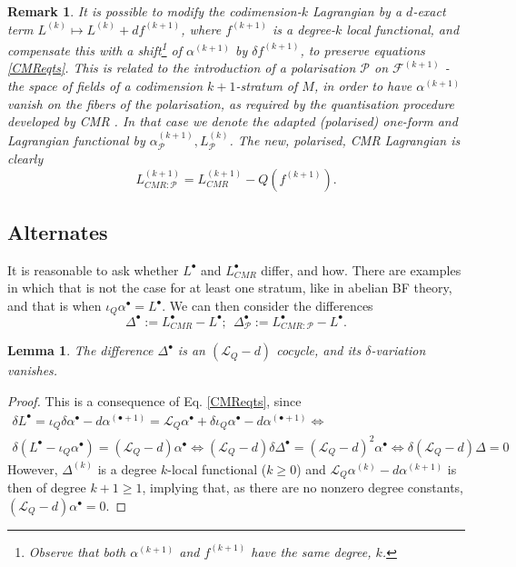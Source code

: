 \documentclass[a4paper,reqno]{amsart}
\newtheorem{lemma}[definition]{Lemma}
\newtheorem{remark}[definition]{Remark}
\newcommand{\LQ}{\mathcal{L}_{Q}}
\begin{document}
\begin{remark}\label{polarisationremark}
It is possible to modify the codimension-$k$ Lagrangian by a $d$-exact term $L^{(k)} \mapsto L^{(k)} + df^{(k+1)}$, where $f^{(k+1)}$ is a degree-$k$ local functional, and compensate this with a shift\footnote{Observe that both $\alpha^{(k+1)}$ and $f^{(k+1)}$ have the same degree, $k$.} of $\alpha^{(k+1)}$ by $\delta f^{(k+1)}$, to preserve equations \eqref{CMReqts}. This is related to the introduction of a polarisation $\mathcal{P}$ on $\mathcal{F}^{(k+1)}$ - the space of fields of a codimension $k+1$-stratum of $M$, in order to have $\alpha^{(k+1)}$ vanish on the fibers of the polarisation, as required by the quantisation procedure developed by CMR \cite{CMR2}. In that case we denote the adapted (polarised) one-form and Lagrangian functional by $\alpha^{(k+1)}_{\mathcal{P}},L^{(k)}_{\mathcal{P}}$. The new, polarised, CMR Lagrangian is clearly 
$$L^{(k+1)}_{CMR:\mathcal{P}}=L^{(k+1)}_{CMR} - Q (f^{(k+1)}).$$
\end{remark}

\subsection{Alternates}

It is reasonable to ask whether $L^{\bullet}$ and $L^{\bullet}_{CMR}$ differ, and how. There are examples in which that is not the case for at least one stratum, like in abelian BF theory, and that is when $\iota_{Q}\alpha^{\bullet} = L^{\bullet}$. We can then consider the differences
\begin{equation}
\Delta^{\bullet} := L^{\bullet}_{CMR} - L^{\bullet};\ \ \Delta^{\bullet}_{\mathcal{P}} := L^{\bullet}_{CMR:\mathcal{P}} - L^{\bullet}.
\end{equation}


\begin{lemma}\label{Deltacocycle}
The difference $\Delta^\bullet$ is an $(\LQ - d)$ cocycle, and its $\delta$-variation vanishes.
\end{lemma}

\begin{proof}
This is a consequence of Eq. \eqref{CMReqts}, since
\begin{multline}
\delta L^\bullet = \iota_Q\delta\alpha^{\bullet} - d\alpha^{(\bullet+1)} = \LQ\alpha^\bullet + \delta\iota_Q\alpha^\bullet - d\alpha^{(\bullet+1)} \iff \\
\delta (L^\bullet-\iota_Q\alpha^\bullet) = (\LQ - d)\alpha^\bullet \iff (\LQ - d)\delta \Delta^\bullet = (\LQ - d)^2\alpha^\bullet\iff \delta (\LQ - d)\Delta = 0
\end{multline}
However, $\Delta^{(k)}$ is a degree $k$-local functional ($k\geq 0$) and $\LQ \alpha^{(k)} - d\alpha^{(k+1)}$ is then of degree $k+1 \geq 1$, implying that, as there are no nonzero degree constants, $(\LQ -d)\alpha^\bullet=0$.
\end{proof}
\end{document}
